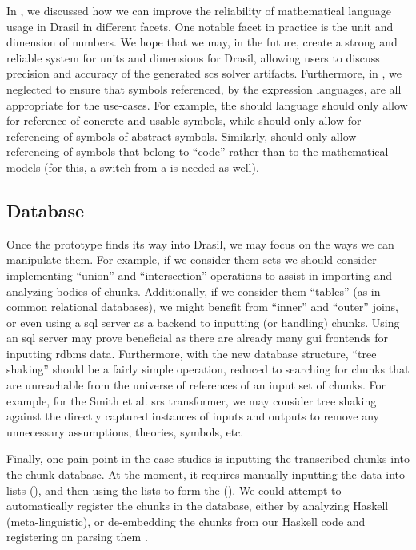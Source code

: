 In , we discussed how we can improve the
reliability of mathematical language usage in Drasil in different facets. One
notable facet in practice is the unit and dimension of numbers. We hope that we
may, in the future, create a strong and reliable system for units and dimensions
for Drasil, allowing users to discuss precision and accuracy of the generated
\acs{scs} solver artifacts. Furthermore, in , we neglected
to ensure that symbols referenced, by the expression languages, are all
appropriate for the use-cases. For example, the \Expr{} should language should
only allow for reference of concrete and usable symbols, while \ModelExpr{}
should only allow for referencing of symbols of abstract symbols. Similarly,
\CodeExpr{} should only allow referencing of symbols that belong to ``code''
rather than to the mathematical models (for this, a switch from a
\QuantityDict{} is needed as well).

\subsection{Database}
\label{chap:futureWork:sec:chunks:sub:database}

Once the \ChunkDB{} prototype finds its way into Drasil, we may focus on the
ways we can manipulate them. For example, if we consider them sets we should
consider implementing ``union'' and ``intersection'' operations to assist in
importing and analyzing bodies of chunks. Additionally, if we consider them
``tables'' (as in common relational databases), we might benefit from ``inner''
and ``outer'' joins, or even using a \acs{sql} server as a backend to inputting
(or handling) chunks. Using an \acs{sql} server may prove beneficial as there
are already many \acs{gui} frontends for inputting \acs{rdbms} data.
Furthermore, with the new database structure, ``tree shaking'' should be a
fairly simple operation, reduced to searching for chunks that are unreachable
from the universe of references of an input set of chunks. For example, for the
Smith et al. \acs{srs} transformer, we may consider tree shaking against the
directly captured instances of inputs and outputs to remove any unnecessary
assumptions, theories, symbols, etc.

Finally, one pain-point in the case studies is inputting the transcribed chunks
into the chunk database. At the moment, it requires manually inputting the data
into lists (), and then using the
lists to form the \ChunkDB{}
(). We could attempt to
automatically register the chunks in the database, either by analyzing Haskell
(meta-linguistic), or de-embedding the chunks from our Haskell code and
registering on parsing them \cite{DrasilIssue2873ChunkDBCaretteResponse}. 
